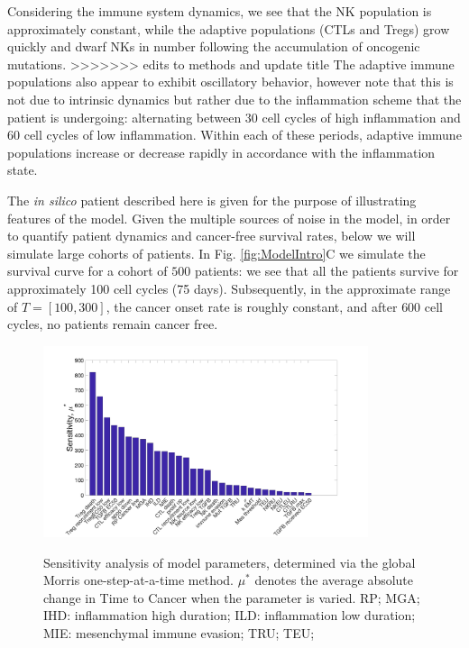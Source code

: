 \documentclass[11pt]{article}
\begin{document}
\par 
Considering the immune system dynamics, we see that the NK population is approximately constant, while the adaptive populations (CTLs and Tregs) grow quickly and dwarf NKs in number following the accumulation of oncogenic mutations.
>>>>>>> edits to methods and update title
The adaptive immune populations also appear to exhibit oscillatory behavior, however note that this is not due to intrinsic dynamics but rather due to the inflammation scheme that the patient is undergoing: alternating between 30 cell cycles of high inflammation and 60 cell cycles of low inflammation. Within each of these periods, adaptive immune populations increase or decrease rapidly in accordance with the inflammation state.
\par 
The {\em in silico} patient described here is given for the purpose of illustrating features of the model. Given the multiple sources of noise in the model, in order to quantify patient dynamics and cancer-free survival rates, below we will simulate large cohorts of patients. In Fig. \ref{fig:ModelIntro}C we simulate the survival curve for a cohort of $500$ patients: we see that all the patients survive for approximately 100 cell cycles (75 days). Subsequently, in the approximate range of $T= [100,300]$, the cancer onset rate is roughly constant, and after $600$ cell cycles, no patients remain cancer free.




\begin{figure}
\center
{\includegraphics[width=0.85\textwidth]{Figure2/Figure2.jpg}}
\caption{Sensitivity analysis of model parameters, determined via the global Morris one-step-at-a-time method. $\mu^*$ denotes the average absolute change in Time to Cancer when the parameter is varied. RP; MGA; IHD: inflammation high duration; ILD: inflammation low duration; MIE: mesenchymal immune evasion; TRU; TEU; }
\label{fig:MOAT}
\end{figure}
\end{document}

